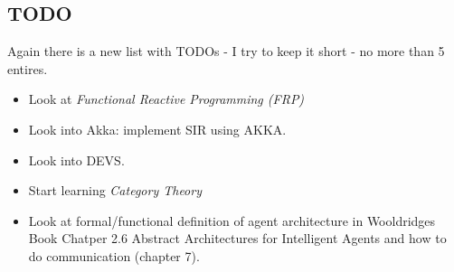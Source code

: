 \subsection*{TODO}
Again there is a new list with TODOs - I try to keep it short - no more than 5 entires.
\begin{itemize}
\item Look at \textit{Functional Reactive Programming (FRP)}
\item Look into Akka: implement SIR using AKKA.
\item Look into DEVS.
\item Start learning \textit{Category Theory}
\item Look at formal/functional definition of agent architecture in Wooldridges Book Chatper 2.6 Abstract Architectures for Intelligent Agents and how to do communication (chapter 7).
\end{itemize}